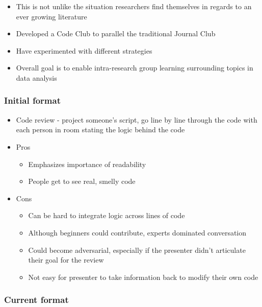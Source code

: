 \documentclass[
  11pt,
]{article}
\providecommand{\tightlist}{%
  \setlength{\itemsep}{0pt}\setlength{\parskip}{0pt}}
\begin{document}
\begin{itemize}
\tightlist
\item
  This is not unlike the situation researchers find themselves in
  regards to an ever growing literature
\item
  Developed a Code Club to parallel the traditional Journal Club
\item
  Have experimented with different strategies
\item
  Overall goal is to enable intra-research group learning surrounding
  topics in data analysis
\end{itemize}

\hypertarget{initial-format}{%
\subsubsection{Initial format}\label{initial-format}}

\begin{itemize}
\tightlist
\item
  Code review - project someone's script, go line by line through the
  code with each person in room stating the logic behind the code
\item
  Pros

  \begin{itemize}
  \tightlist
  \item
    Emphasizes importance of readability
  \item
    People get to see real, smelly code
  \end{itemize}
\item
  Cons

  \begin{itemize}
  \tightlist
  \item
    Can be hard to integrate logic across lines of code
  \item
    Although beginners could contribute, experts dominated conversation
  \item
    Could become adversarial, especially if the presenter didn't
    articulate their goal for the review
  \item
    Not easy for presenter to take information back to modify their own
    code
  \end{itemize}
\end{itemize}

\hypertarget{current-format}{%
\subsubsection{Current format}\label{current-format}}
\end{document}
